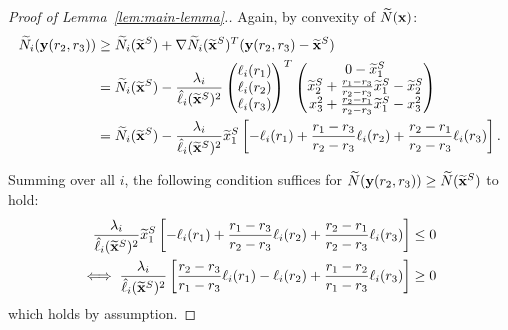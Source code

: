 \documentclass[12pt]{article}
\begin{document}
\begin{proof}[Proof of Lemma~\ref{lem:main-lemma}.]
Again, by convexity of $\widetilde{N}(\mathbf{x})$:
\begin{align*}
\widetilde{N}_i(\mathbf{y}(r_2,r_3)) &\geq \widetilde{N}_i(\widetilde{\mathbf{x}}^S) + \nabla \widetilde{N}_i(\widetilde{\mathbf{x}}^S)^T(\mathbf{y}(r_2,r_3) - \widetilde{\mathbf{x}}^S) \\
&= \widetilde{N}_i(\widetilde{\mathbf{x}}^S) - \frac{\lambda_i}{\hat{\ell}_i(\widetilde{\mathbf{x}}^S)^2}\begin{pmatrix}
\ell_{i}(r_1)\\
\ell_{i}(r_2) \\
\ell_i(r_3)
\end{pmatrix}^T	\begin{pmatrix}
0-\widetilde{x}^S_1\\
\widetilde{x}^S_2 + \frac{r_1-r_3}{r_2-r_3}\widetilde{x}^S_1 - \widetilde{x}^S_2 \\
x_3^2 + \frac{r_2-r_1}{r_2-r_3}\widetilde{x}^S_1 - x_3^2
\end{pmatrix} \\
&= \widetilde{N}_i(\widetilde{\mathbf{x}}^S) - \frac{\lambda_i}{\hat{\ell}_i(\widetilde{\mathbf{x}}^S)^2}\widetilde{x}^S_1\left[-\ell_{i}(r_1) + \frac{r_1-r_3}{r_2-r_3}\ell_{i}(r_2) + \frac{r_2-r_1}{r_2-r_3}\ell_i(r_3)\right].
\end{align*}

Summing over all $i$, the following condition suffices for $\widetilde{N}(\mathbf{y}(r_2,r_3)) \geq \widetilde{N}(\widetilde{\mathbf{x}}^S)$ to hold:
\begin{align*}
\frac{\lambda_i}{\hat{\ell}_i(\widetilde{\mathbf{x}}^S)^2}\widetilde{x}^S_1\left[-\ell_{i}(r_1) + \frac{r_1-r_3}{r_2-r_3}\ell_{i}(r_2) + \frac{r_2-r_1}{r_2-r_3}\ell_i(r_3)\right] \leq 0 \\
\iff \frac{\lambda_i}{\hat{\ell}_i(\widetilde{\mathbf{x}}^S)^2}\left[\frac{r_2-r_3}{r_1-r_3}\ell_{i}(r_1) -\ell_{i}(r_2) + \frac{r_1-r_2}{r_1-r_3}\ell_i(r_3)\right] \geq 0
\end{align*}
which holds by assumption.
\end{proof}


\end{document}
